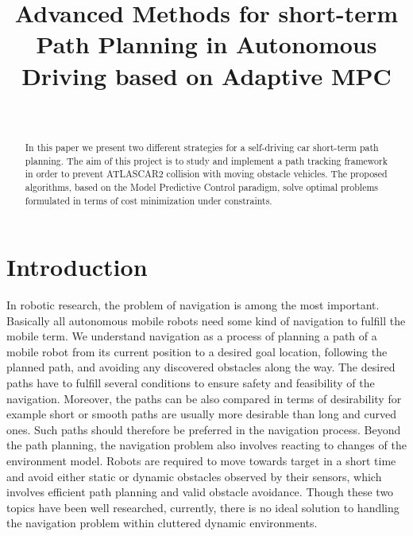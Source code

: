 \documentclass[conference, 11pt]{IEEEtran}
\title{Advanced Methods for short-term Path Planning in Autonomous Driving based on Adaptive MPC}
\author{\IEEEauthorblockN{Alberto Franco}\\
\IEEEauthorblockA{Department of Information Engineering\\
Università degli Studi di Padova\\ \href{mailto:alberto.franco.3@studenti.unipd.it}{alberto.franco.3@studenti.unipd.it}}}
\begin{document}
\maketitle
\begin{abstract}
	In this paper we present two different strategies for a self-driving car short-term path planning. The aim of this project is to study and implement a path tracking framework in order to prevent ATLASCAR2 collision with moving obstacle vehicles. The proposed algorithms, based on the Model Predictive Control paradigm, solve optimal problems formulated in terms of cost minimization under constraints.
\end{abstract}

\section{Introduction}
In robotic research, the problem of navigation is among the most important. Basically all autonomous mobile robots need some kind of navigation to fulfill the mobile term.
We understand navigation as a process of planning a path of a mobile robot from its current position to a desired goal location, following the planned path, and avoiding any discovered obstacles along the way. The desired paths have to
fulfill several conditions to ensure safety and feasibility of the navigation. Moreover, the paths can be also compared in terms of desirability for example short or smooth paths are usually more desirable than long and curved ones. Such paths should therefore be preferred in the navigation process. Beyond the path planning, the navigation problem also involves reacting to changes of the environment model. Robots are required to move towards target in a short time and avoid either static or dynamic obstacles observed by their sensors, which involves efficient path planning and valid obstacle avoidance. Though these two topics have been well researched, currently, there is no ideal solution to handling the navigation problem within cluttered dynamic environments.
\end{document}
